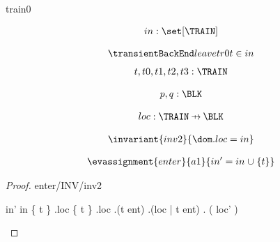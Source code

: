 \documentclass[12pt]{amsart}
\title{}
\author{}
\date{} %
\begin{document}
\maketitle
\tableofcontents


\begin{machine}{train0}

\newset{\TRAIN}
\newset{\BLK}
\newset{\LOC}

%
	\begin{align*}
\variable{		in : \set[\TRAIN]}
	\end{align*}
%



\begin{align*}
\transientB{leave}{tr0}
{ \index{t}{t} }
{	t \in in	}
\end{align*}
\begin{align*}
\dummy{	t,t0,t1,t2,t3 : \TRAIN}
\end{align*}

\begin{align*}
\dummy{	p,q : \BLK}
\end{align*}


\begin{align*}
\variable{	loc : \TRAIN \pfun \BLK}
\end{align*}

\begin{align*}
\invariant{inv2}
{	\dom . loc = in	}
\end{align*}

\begin{align*}
\evassignment{enter}{a1}
{	in' = in \bunion \{ t \}	}
\end{align*}

\begin{proof}{enter/INV/inv2}
	\begin{calculation}
		in'
	\hint{=}{ \ref{a1} }
		in \bunion \{ t \}
	\hint{=}{ \ref{inv2} }
		\dom.loc \bunion \{ t \}
		\dom.loc \bunion \dom.(t \fun ent)
		\dom.(loc   |   t \fun ent)
	\hint{=}{ \ref{a2} }
		\dom. ( loc' )
	\end{calculation}
\end{proof}


\end{machine}
\end{document}
